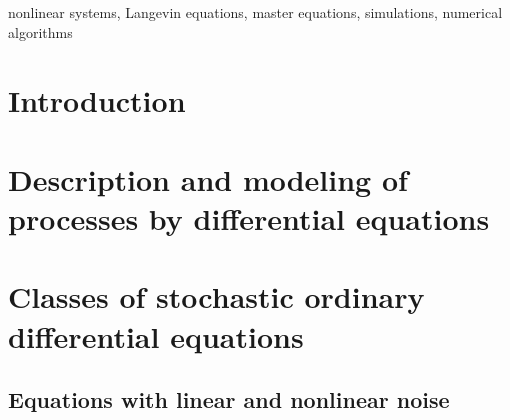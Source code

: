 \documentclass[authoryear,draft,1p,times]{elsarticle}
\renewcommand{\=}{\stackrel{\mathrm{d}}{=}}
\begin{document}
\begin{frontmatter}
\begin{abstract}



\end{abstract}

\begin{keyword}
nonlinear systems, Langevin equations, master equations, simulations, 
 numerical algorithms



\end{keyword}

\end{frontmatter}

\section*{ Introduction }

\section{Description and modeling of processes by differential equations} 

\section{Classes of stochastic ordinary differential equations}

\subsection{Equations with linear and nonlinear noise}
\end{document}
